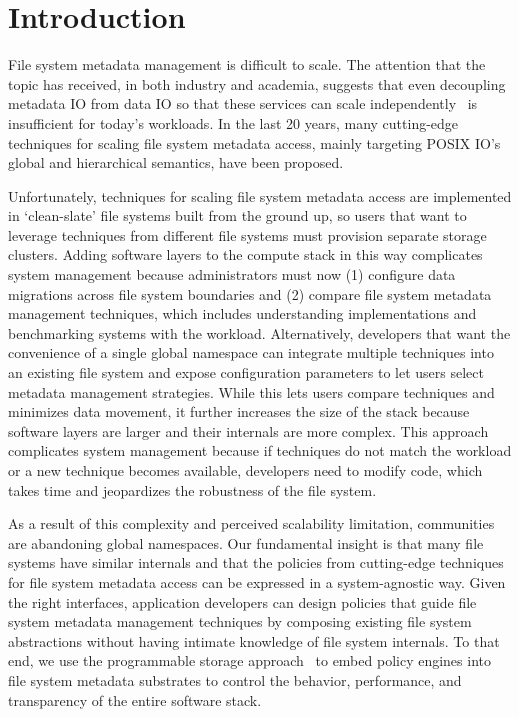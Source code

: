 \chapter{Introduction}

File system metadata management is difficult to scale. The attention that the
topic has received, in both industry and academia, suggests that even
decoupling metadata IO from data IO so that these services can scale
independently~\cite{alam:pdsw2011-metadata-scaling, ghemawat:sosp2003-gfs,
hildebrand:msst2005-pnfs, weil:osdi2006-ceph, welch:fast2008-panasas,
xing:sc2009-skyfs} is insufficient for today's workloads. In the last 20 years,
many cutting-edge techniques for scaling file system metadata access, mainly
targeting POSIX IO's global and hierarchical semantics, have been proposed.

Unfortunately, techniques for scaling file system metadata access are
implemented in `clean-slate' file systems built from the ground up, so users
that want to leverage techniques from different file systems must provision
separate storage clusters. Adding software layers to the compute stack in this
way complicates system management because administrators must now (1) configure
data migrations across file system boundaries and (2) compare file system
metadata management techniques, which includes understanding implementations
and benchmarking systems with the workload.  Alternatively, developers that
want the convenience of a single global namespace can integrate multiple
techniques into an existing file system and expose configuration parameters to
let users select metadata management strategies.  While this lets users compare
techniques and minimizes data movement, it further increases the size of the
stack because software layers are larger and their internals are more complex.
This approach complicates system management because if techniques do not match
the workload or a new technique becomes available, developers need to modify
code, which takes time and jeopardizes the robustness of the file system.

As a result of this complexity and perceived scalability limitation,
communities are abandoning global namespaces.  Our fundamental insight is that
many file systems have similar internals and that the policies from
cutting-edge techniques for file system metadata access can be expressed in a
system-agnostic way.  Given the right interfaces, application developers can
design policies that guide file system metadata management techniques by
composing existing file system abstractions without having intimate
knowledge of file system internals.  To that end, we use the programmable
storage approach~\cite{sevilla:eurosys17-malacology} to embed policy engines
into file system metadata substrates to control the behavior, performance, and
transparency of the entire software stack.

